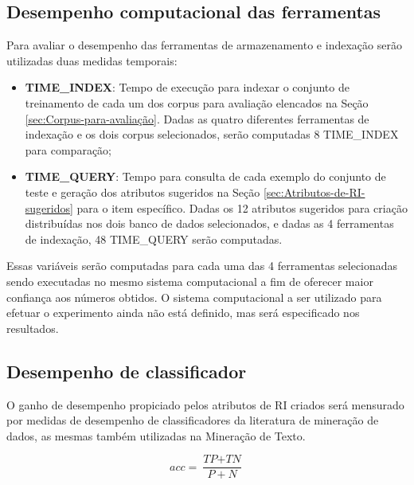     \subsection{Desempenho computacional das ferramentas}  \label{subsec:Desempenho-computacional}
        Para avaliar o desempenho das ferramentas de armazenamento e indexação serão utilizadas duas medidas temporais:
        \begin{itemize}
            \item \textbf{TIME\_INDEX}: Tempo de execução para indexar o conjunto de treinamento de cada um dos corpus para avaliação elencados na Seção \ref{sec:Corpus-para-avaliação}. Dadas as quatro diferentes ferramentas de indexação e os dois corpus selecionados, serão computadas 8 TIME\_INDEX para comparação;
            
            \item \textbf{TIME\_QUERY}: Tempo para consulta de cada exemplo do conjunto de teste e geração dos atributos sugeridos na Seção \ref{sec:Atributos-de-RI-sugeridos} para o item específico. Dadas os 12 atributos sugeridos para criação distribuídas nos dois banco de dados selecionados, e dadas as 4 ferramentas de indexação, 48 TIME\_QUERY serão computadas.  
        \end{itemize}
        
        Essas variáveis serão computadas para cada uma das 4 ferramentas selecionadas sendo executadas no mesmo sistema computacional a fim de oferecer maior confiança aos números obtidos. 
        O sistema computacional a ser utilizado para efetuar o experimento ainda não está definido, mas será especificado nos resultados.
    
    \subsection{Desempenho de classificador}  \label{subsec:Desempenho-de-classificador}
        O ganho de desempenho propiciado pelos atributos de RI criados será mensurado por medidas de desempenho de classificadores da literatura de mineração de dados, as mesmas também utilizadas na Mineração de Texto.

            \begin{equation}
                \label{eq:medida-acurácia}
        		acc = 
        		\frac{\textit{TP} + \textit{TN}}{P + N}
            \end{equation}

